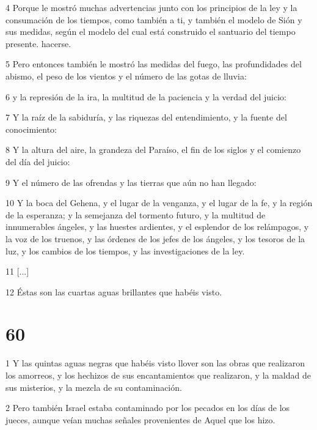 \par 4 Porque le mostró muchas advertencias junto con los principios de la ley y la consumación de los tiempos, como también a ti, y también el modelo de Sión y sus medidas, según el modelo del cual está construido el santuario del tiempo presente. hacerse.

\par 5 Pero entonces también le mostró las medidas del fuego, las profundidades del abismo, el peso de los vientos y el número de las gotas de lluvia:

\par 6 y la represión de la ira, la multitud de la paciencia y la verdad del juicio:

\par 7 Y la raíz de la sabiduría, y las riquezas del entendimiento, y la fuente del conocimiento:

\par 8 Y la altura del aire, la grandeza del Paraíso, el fin de los siglos y el comienzo del día del juicio:

\par 9 Y el número de las ofrendas y las tierras que aún no han llegado:

\par 10 Y la boca del Gehena, y el lugar de la venganza, y el lugar de la fe, y la región de la esperanza; y la semejanza del tormento futuro, y la multitud de innumerables ángeles, y las huestes ardientes, y el esplendor de los relámpagos, y la voz de los truenos, y las órdenes de los jefes de los ángeles, y los tesoros de la luz, y los cambios de los tiempos, y las investigaciones de la ley.

\par 11 [...]

\par 12 Éstas son las cuartas aguas brillantes que habéis visto.

\chapter{60}

\par 1 Y las quintas aguas negras que habéis visto llover son las obras que realizaron los amorreos, y los hechizos de sus encantamientos que realizaron, y la maldad de sus misterios, y la mezcla de su contaminación.

\par 2 Pero también Israel estaba contaminado por los pecados en los días de los jueces, aunque veían muchas señales provenientes de Aquel que los hizo.

